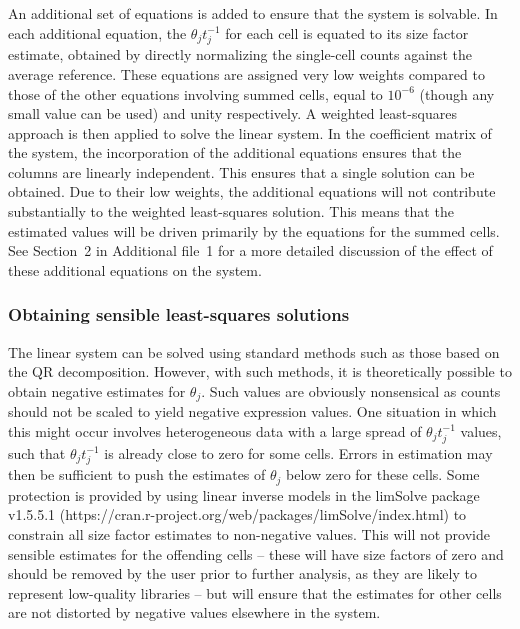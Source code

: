 \documentclass{bmcart}
\newcommand{\supplineardep}{2}
\newcommand{\revised}[1]{#1}
\begin{document}
An additional set of equations is added to ensure that the system is solvable.
In each \revised{additional} equation, the $\theta_jt_j^{-1}$ for each cell is equated to its size factor estimate, obtained by directly normalizing the single-cell counts against the average reference.
These equations are assigned very low weights compared to those of the other equations involving summed cells, equal to $10^{-6}$ (though any small value can be used) and unity respectively.
A weighted least-squares approach is then applied to solve the linear system.
In the \revised{coefficient matrix} of the system, the incorporation of the additional equations ensures that the columns are linearly independent.
This ensures that a single solution can be obtained.
Due to their low weights, the additional equations will not contribute substantially to the weighted least-squares solution.
This means that the estimated values will be driven primarily by the equations for the summed cells.
See Section~\supplineardep{} in Additional file~1 for a more detailed discussion of the effect of these additional equations on the system.


\subsubsection*{Obtaining sensible least-squares solutions}
The linear system can be solved using standard methods such as those based on the QR decomposition.
However, with such methods, it is theoretically possible to obtain negative estimates for $\theta_j$.
Such values are obviously nonsensical as counts should not be scaled to yield negative expression values.
One situation in which this might occur involves \revised{heterogeneous} data with a large spread of $\theta_jt_j^{-1}$ values, such that $\theta_jt_j^{-1}$ is already close to zero for some cells.
Errors in estimation may then be sufficient to push the \revised{estimates of} $\theta_j$ below zero \revised{for these cells}.
Some protection is provided by using linear inverse models in the limSolve package v1.5.5.1 ({https://cran.r-project.org/web/packages/limSolve/index.html}) \cite{soetaert2009limsolve} to constrain all size factor estimates to non-negative values.
This will not provide sensible estimates for the offending cells 
    -- these will have size factors of zero and should be removed by the user prior to further analysis, as they are likely to represent low-quality libraries 
    -- but will ensure that the estimates for other cells are not distorted by negative values elsewhere in the system.
\end{document}
